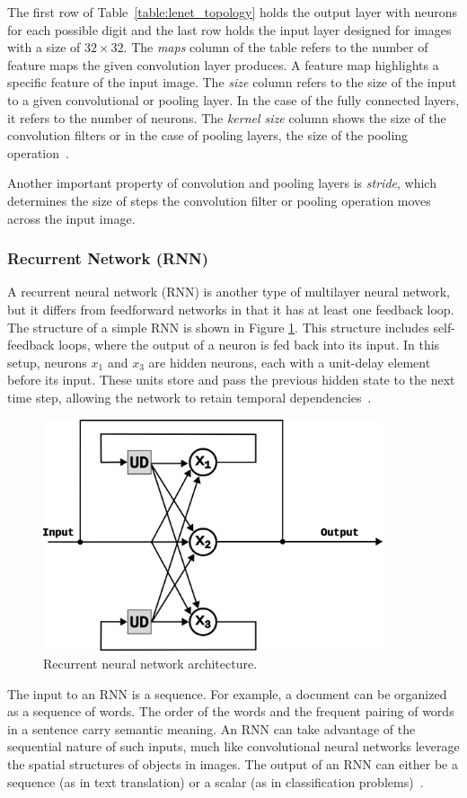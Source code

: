 \documentclass[a4paper,oneside,onecolumn,12pt]{book}
\begin{document}
		The first row of Table~\ref{table:lenet_topology} holds the output layer with neurons for each possible digit and the last row holds the input layer designed for images with a size of $32 \times 32$. The \textit{maps} column of the table refers to the number of feature maps the given convolution layer produces. A feature map highlights a specific feature of the input image. The \textit{size} column refers to the size of the input to a given convolutional or pooling layer. In the case of the fully connected layers, it refers to the number of neurons. The \textit{kernel size} column shows the size of the convolution filters or in the case of pooling layers, the size of the pooling operation~\cite{HMLSKT}.
		
		Another important property of convolution and pooling layers is \textit{stride}, which determines the size of steps the convolution filter or pooling operation moves across the input image.

		\subsubsection{Recurrent Network (RNN)}
		A recurrent neural network (RNN) is another type of multilayer neural network, but it differs from feedforward networks in that it has at least one feedback loop. The structure of a simple RNN is shown in Figure \ref{fig:rnn}. This structure includes self-feedback loops, where the output of a neuron is fed back into its input. In this setup, neurons $x_1$ and $x_3$ are hidden neurons, each with a unit-delay element before its input. These units store and pass the previous hidden state to the next time step, allowing the network to retain temporal dependencies~\cite{NNACF}.
		\begin{figure}[H]
		\begin{center}
			\includegraphics[keepaspectratio,width=10cm]{kep/rnn.png}
			\caption{Recurrent neural network architecture.}
			\label{fig:rnn}
		\end{center}
		\end{figure}
		The input to an RNN is a sequence. For example, a document can be organized as a sequence of words. The order of the words and the frequent pairing of words in a sentence carry semantic meaning. An RNN can take advantage of the sequential nature of such inputs, much like convolutional neural networks leverage the spatial structures of objects in images. The output of an RNN can either be a sequence (as in text translation) or a scalar (as in classification problems)~\cite{AISL}.
\end{document}
